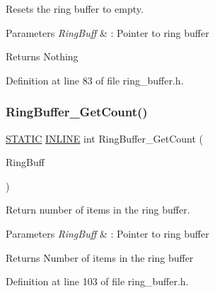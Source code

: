 Resets the ring buffer to empty. 


\begin{DoxyParams}{Parameters}
{\em Ring\+Buff} & \+: Pointer to ring buffer \\
\hline
\end{DoxyParams}
\begin{DoxyReturn}{Returns}
Nothing 
\end{DoxyReturn}


Definition at line 83 of file ring\+\_\+buffer.\+h.

\mbox{\label{group___ring___buffer_ga7b69777c35694637acaf39e6bfcc1822}} 
\subsubsection{\texorpdfstring{Ring\+Buffer\+\_\+\+Get\+Count()}{RingBuffer\_GetCount()}}
{\footnotesize\ttfamily \hyperlink{group___l_p_c___types___public___macros_ga10b2d890d871e1489bb02b7e70d9bdfb}{S\+T\+A\+T\+IC} \hyperlink{spifi__18xx__43xx_8h_a2eb6f9e0395b47b8d5e3eeae4fe0c116}{I\+N\+L\+I\+NE} int Ring\+Buffer\+\_\+\+Get\+Count (\begin{DoxyParamCaption}\item[{\hyperlink{struct_r_i_n_g_b_u_f_f___t}{R\+I\+N\+G\+B\+U\+F\+F\+\_\+T} $\ast$}]{Ring\+Buff }\end{DoxyParamCaption})}



Return number of items in the ring buffer. 


\begin{DoxyParams}{Parameters}
{\em Ring\+Buff} & \+: Pointer to ring buffer \\
\hline
\end{DoxyParams}
\begin{DoxyReturn}{Returns}
Number of items in the ring buffer 
\end{DoxyReturn}


Definition at line 103 of file ring\+\_\+buffer.\+h.

\mbox{\label{group___ring___buffer_ga75424687def8979742338366d39c8559}} 
